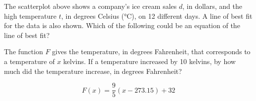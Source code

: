 \noindent\markforreview
\vspace{1em}

\begin{center}

\end{center}

The scatterplot above shows a company’s ice cream sales $d$, in dollars, and the high temperature $t$, in degrees Celsius (°C), on 12 different days.  
A line of best fit for the data is also shown.  
Which of the following could be an equation of the line of best fit?

\vspace{0.75em}



\vspace{2em}
\noindent\markforreview

\vspace{1em}

The function \( F \) gives the temperature, in degrees Fahrenheit, that corresponds to a temperature of \( x \) kelvins. If a temperature increased by 10 kelvins, by how much did the temperature increase, in degrees Fahrenheit?

\[
F(x) = \frac{9}{5}(x - 273.15) + 32
\]

\newpage


\noindent\markforreview

